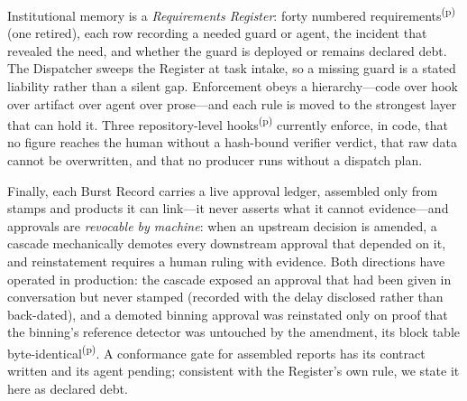 \documentclass[twocolumn]{aastex631}
\newcommand{\prov}{\textsuperscript{(p)}}   %
\begin{document}
Institutional memory is a \emph{Requirements Register}: forty numbered
requirements\prov{} (one retired), each row recording a needed guard or
agent, the incident that revealed the need, and whether the guard is
deployed or remains declared debt. The Dispatcher sweeps the Register at
task intake, so a missing guard is a stated liability rather than a
silent gap. Enforcement obeys a hierarchy---code over hook over artifact
over agent over prose---and each rule is moved to the strongest layer that
can hold it. Three repository-level hooks\prov{} currently enforce, in code, that
no figure reaches the human without a hash-bound verifier verdict, that
raw data cannot be overwritten, and that no producer runs without a
dispatch plan.

Finally, each Burst Record carries a live approval ledger, assembled only
from stamps and products it can link---it never asserts what it cannot
evidence---and approvals are \emph{revocable by machine}: when an
upstream decision is amended, a cascade mechanically demotes every
downstream approval that depended on it, and reinstatement requires a
human ruling with evidence. Both directions have operated in production:
the cascade exposed an approval that had been given in conversation but
never stamped (recorded with the delay disclosed rather than back-dated),
and a demoted binning approval was reinstated only on proof that the
binning's reference detector was untouched by the amendment, its block
table byte-identical\prov. A conformance gate for assembled reports has
its contract written and its agent pending; consistent with the
Register's own rule, we state it here as declared debt.

\end{document}
